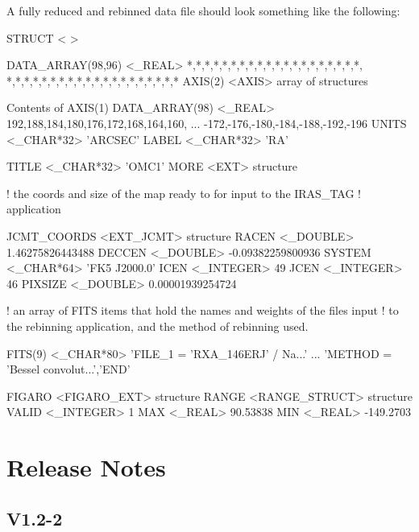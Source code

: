 \documentclass[twoside,11pt,nolof]{starlink}
\begin{document}
\goodbreak

A fully reduced and rebinned data file should look something like the
following:

\begin{small}
\begin{terminalv}
STRUCT  < >

   DATA_ARRAY(98,96)  <_REAL>     *,*,*,*,*,*,*,*,*,*,*,*,*,*,*,*,*,*,*,*,
                                  *,*,*,*,*,*,*,*,*,*,*,*,*,*,*,*,*,*,*,*
   AXIS(2)        <AXIS>          {array of structures}

   Contents of AXIS(1)
      DATA_ARRAY(98)  <_REAL>        192,188,184,180,176,172,168,164,160,
                                     ... -172,-176,-180,-184,-188,-192,-196
      UNITS          <_CHAR*32>      'ARCSEC'
      LABEL          <_CHAR*32>      'RA'

   TITLE          <_CHAR*32>      'OMC1'
   MORE           <EXT>           {structure}

! the coords and size of the map ready to for input to the IRAS_TAG
! application

      JCMT_COORDS    <EXT_JCMT>      {structure}
         RACEN          <_DOUBLE>       1.46275826443488
         DECCEN         <_DOUBLE>       -0.09382259800936
         SYSTEM         <_CHAR*64>      'FK5 J2000.0'
         ICEN           <_INTEGER>      49
         JCEN           <_INTEGER>      46
         PIXSIZE        <_DOUBLE>       0.00001939254724

! an array of FITS items that hold the names and weights of the files input
! to the rebinning application, and the method of rebinning used.

      FITS(9)        <_CHAR*80>      'FILE_1  = 'RXA_146ERJ'         / Na...'
                                     ... 'METHOD  = 'Bessel convolut...','END'


      FIGARO         <FIGARO_EXT>    {structure}
         RANGE          <RANGE_STRUCT>   {structure}
            VALID          <_INTEGER>      1
            MAX            <_REAL>         90.53838
            MIN            <_REAL>         -149.2703
\end{terminalv}
\end{small}

\section*{Release Notes}

\subsection*{V1.2-2}
\end{document}
